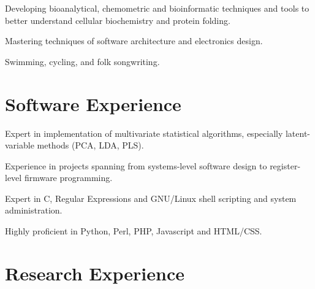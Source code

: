 \documentclass[letterpaper]{article}
\renewenvironment{itemize}{
  \begin{list}{}{
    \setlength{\leftmargin}{1.5em}
  }
}{
  \end{list}
}
\begin{document}
\begin{itemize}
\item{
  Developing bioanalytical, chemometric and bioinformatic techniques and
  tools to better understand cellular biochemistry and protein folding.
}
\item{
  Mastering techniques of software architecture and electronics design.
}
\item{
  Swimming, cycling, and folk songwriting.
}
\end{itemize}


\section*{Software Experience}

\begin{itemize}
\item{
  Expert in implementation of multivariate statistical algorithms,
  especially latent-variable methods (PCA, LDA, PLS).
}
\item{
  Experience in projects spanning from systems-level software design to
  register-level firmware programming.
}
\item{
  Expert in C, Regular Expressions and GNU/Linux shell scripting and
  system administration.
}
\item{
  Highly proficient in Python, Perl, PHP, Javascript and HTML/CSS.
}
\end{itemize}


\section*{Research Experience}
\end{document}
